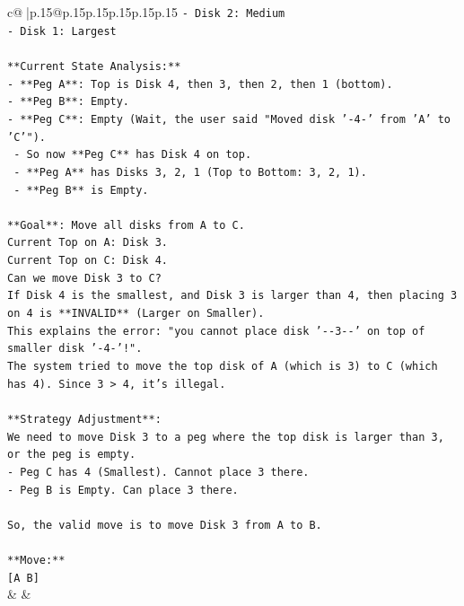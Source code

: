 \documentclass{article}
\begin{document}
{\begin{supertabular}{c@{$\;$}|p{.15\linewidth}@{}p{.15\linewidth}p{.15\linewidth}p{.15\linewidth}p{.15\linewidth}p{.15\linewidth}}
{{{\texttt{{-} Disk 2: Medium} \\
\texttt{{-} Disk 1: Largest} \\
\\ 
\texttt{**Current State Analysis:**} \\
\texttt{{-} **Peg A**: Top is Disk 4, then 3, then 2, then 1 (bottom).} \\
\texttt{{-} **Peg B**: Empty.} \\
\texttt{{-} **Peg C**: Empty (Wait, the user said "Moved disk '{-}4{-}' from 'A' to 'C'").} \\
\texttt{  {-} So now **Peg C** has Disk 4 on top.} \\
\texttt{  {-} **Peg A** has Disks 3, 2, 1 (Top to Bottom: 3, 2, 1).} \\
\texttt{  {-} **Peg B** is Empty.} \\
\\ 
\texttt{**Goal**: Move all disks from A to C.} \\
\texttt{Current Top on A: Disk 3.} \\
\texttt{Current Top on C: Disk 4.} \\
\texttt{Can we move Disk 3 to C?} \\
\texttt{If Disk 4 is the smallest, and Disk 3 is larger than 4, then placing 3 on 4 is **INVALID** (Larger on Smaller).} \\
\texttt{This explains the error: "you cannot place disk '{-}{-}3{-}{-}' on top of smaller disk '{-}4{-}'!".} \\
\texttt{The system tried to move the top disk of A (which is 3) to C (which has 4). Since 3 > 4, it's illegal.} \\
\\ 
\texttt{**Strategy Adjustment**:} \\
\texttt{We need to move Disk 3 to a peg where the top disk is larger than 3, or the peg is empty.} \\
\texttt{{-} Peg C has 4 (Smallest). Cannot place 3 there.} \\
\texttt{{-} Peg B is Empty. Can place 3 there.} \\
\\ 
\texttt{So, the valid move is to move Disk 3 from A to B.} \\
\\ 
\texttt{**Move:**} \\
\texttt{{[}A B{]}} \\
            }
        }
    }
    & & \\ \\


\end{supertabular}}
\end{document}
